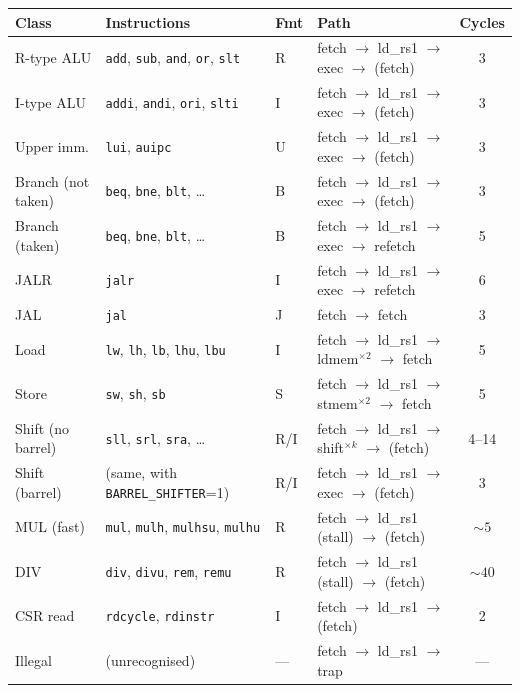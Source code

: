\documentclass[9pt, a4paper]{extarticle}
\begin{document}
\begin{table}[htbp]
\centering\small
\begin{tabular}{@{}l l l l c@{}}
    \toprule
    Class & Instructions & Fmt & Path & Cycles \\
    \midrule
    R-type ALU & \texttt{add}, \texttt{sub}, \texttt{and}, \texttt{or}, \texttt{slt} & R & fetch $\to$ ld\_rs1 $\to$ exec $\to$ (fetch) & 3 \\
    I-type ALU & \texttt{addi}, \texttt{andi}, \texttt{ori}, \texttt{slti} & I & fetch $\to$ ld\_rs1 $\to$ exec $\to$ (fetch) & 3 \\
    Upper imm. & \texttt{lui}, \texttt{auipc} & U & fetch $\to$ ld\_rs1 $\to$ exec $\to$ (fetch) & 3 \\
    Branch (not taken) & \texttt{beq}, \texttt{bne}, \texttt{blt}, \ldots & B & fetch $\to$ ld\_rs1 $\to$ exec $\to$ (fetch) & 3 \\
    Branch (taken) & \texttt{beq}, \texttt{bne}, \texttt{blt}, \ldots & B & fetch $\to$ ld\_rs1 $\to$ exec $\to$ refetch & 5 \\
    JALR & \texttt{jalr} & I & fetch $\to$ ld\_rs1 $\to$ exec $\to$ refetch & 6 \\
    JAL & \texttt{jal} & J & fetch $\to$ fetch & 3 \\
    \midrule
    Load & \texttt{lw}, \texttt{lh}, \texttt{lb}, \texttt{lhu}, \texttt{lbu} & I & fetch $\to$ ld\_rs1 $\to$ ldmem$^{\times 2}$ $\to$ fetch & 5 \\
    Store & \texttt{sw}, \texttt{sh}, \texttt{sb} & S & fetch $\to$ ld\_rs1 $\to$ stmem$^{\times 2}$ $\to$ fetch & 5 \\
    \midrule
    Shift (no barrel) & \texttt{sll}, \texttt{srl}, \texttt{sra}, \ldots & R/I & fetch $\to$ ld\_rs1 $\to$ shift$^{\times k}$ $\to$ (fetch) & 4--14 \\
    Shift (barrel) & (same, with \texttt{BARREL\_SHIFTER}=1) & R/I & fetch $\to$ ld\_rs1 $\to$ exec $\to$ (fetch) & 3 \\
    \midrule
    MUL (fast) & \texttt{mul}, \texttt{mulh}, \texttt{mulhsu}, \texttt{mulhu} & R & fetch $\to$ ld\_rs1\,(stall) $\to$ (fetch) & ${\sim}5$ \\
    DIV & \texttt{div}, \texttt{divu}, \texttt{rem}, \texttt{remu} & R & fetch $\to$ ld\_rs1\,(stall) $\to$ (fetch) & ${\sim}40$ \\
    CSR read & \texttt{rdcycle}, \texttt{rdinstr} & I & fetch $\to$ ld\_rs1 $\to$ (fetch) & 2 \\
    Illegal & (unrecognised) & --- & fetch $\to$ ld\_rs1 $\to$ trap & --- \\

\end{tabular}
\end{table}
\end{document}
